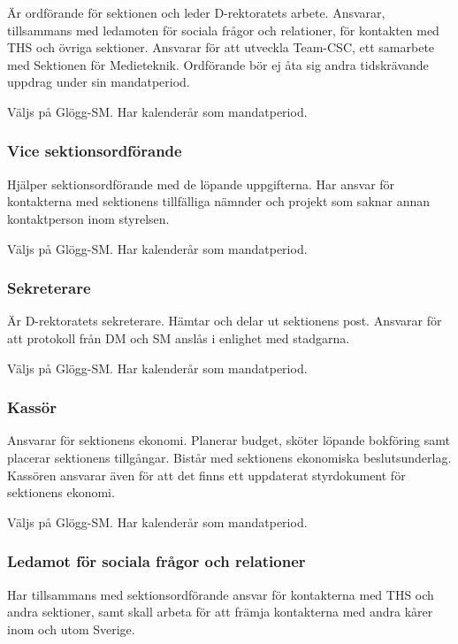 \documentclass{dgovdoc}
\begin{document}
Är ordförande för sektionen och leder D-rektoratets arbete. Ansvarar,
tillsammans med ledamoten för sociala frågor och relationer, för kontakten med
THS och övriga sektioner. Ansvarar för att utveckla Team-CSC, ett samarbete med
Sektionen för Medieteknik. Ordförande bör ej åta sig andra tidskrävande uppdrag
under sin mandatperiod.

Väljs på Glögg-SM. Har kalenderår som mandatperiod.

\subsubsection{Vice sektionsordförande}

Hjälper sektionsordförande med de löpande uppgifterna. Har ansvar för
kontakterna med sektionens tillfälliga nämnder och projekt som saknar annan
kontaktperson inom styrelsen.

Väljs på Glögg-SM. Har kalenderår som mandatperiod.

\subsubsection{Sekreterare}

Är D-rektoratets sekreterare. Hämtar och delar ut sektionens post. Ansvarar
för att protokoll från DM och SM anslås i enlighet med stadgarna.

Väljs på Glögg-SM. Har kalenderår som mandatperiod.

\subsubsection{Kassör}

Ansvarar för sektionens ekonomi. Planerar budget, sköter löpande bokföring
samt placerar sektionens tillgångar. Bistår med sektionens ekonomiska
beslutsunderlag. Kassören ansvarar även för att det finns ett uppdaterat
styrdokument för sektionens ekonomi.

Väljs på Glögg-SM. Har kalenderår som mandatperiod.

\subsubsection{Ledamot för sociala frågor och relationer}

Har tillsammans med sektionsordförande ansvar för kontakterna med THS och andra
sektioner, samt skall arbeta för att främja kontakterna med andra kårer inom
och utom Sverige.
\end{document}
